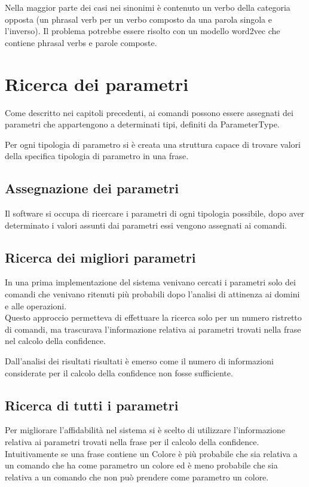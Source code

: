 \documentclass[twoside]{supsistudent}
\begin{document}
Nella maggior parte dei casi nei sinonimi è contenuto un verbo della categoria opposta (un phrasal verb per un verbo composto da una parola singola e l'inverso).
Il problema potrebbe essere risolto con un modello word2vec che contiene phrasal verbs e parole composte.

\chapter{Ricerca dei parametri}
Come descritto nei capitoli precedenti, ai comandi possono essere assegnati dei parametri che appartengono a determinati tipi, definiti da ParameterType.

Per ogni tipologia di parametro si è creata una struttura capace di trovare valori della specifica tipologia di parametro in una frase.
\section{Assegnazione dei parametri}
Il software si occupa di ricercare i parametri di ogni tipologia possibile, dopo aver determinato i valori assunti dai parametri essi vengono assegnati ai comandi. 
\section{Ricerca dei migliori parametri}
In una prima implementazione del sistema venivano cercati i parametri solo dei comandi che venivano ritenuti più probabili dopo l'analisi di attinenza ai domini e alle operazioni.\\
 Questo approccio permetteva di effettuare la ricerca solo per un numero ristretto di comandi, ma trascurava l'informazione relativa ai parametri trovati nella frase nel calcolo della confidence. 

Dall'analisi dei risultati risultati è emerso come il numero di informazioni considerate per il calcolo della confidence non fosse sufficiente.
\section{Ricerca di tutti i parametri}
Per migliorare l'affidabilità nel sistema si è scelto di utilizzare l'informazione relativa ai parametri trovati nella frase per il calcolo della confidence. \\Intuitivamente se una frase contiene un Colore è più probabile che sia relativa a un comando che ha come parametro un colore ed è meno probabile che sia relativa a un comando che non può prendere come parametro un colore.\\
\end{document}
